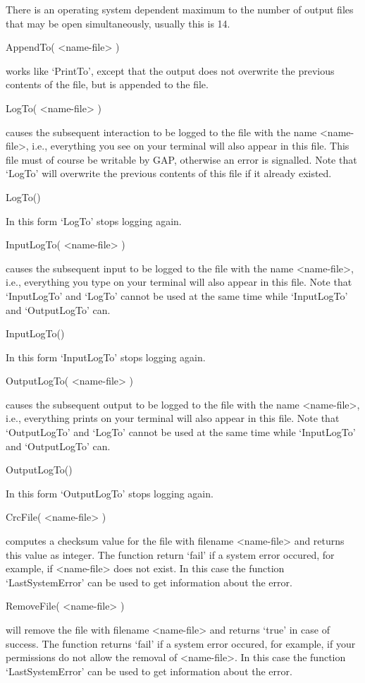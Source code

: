 There is an  operating system dependent maximum  to the number  of output
files that may be open simultaneously, usually this is 14.

\>AppendTo( <name-file> )

works like `PrintTo',  except  that the   output does  not overwrite  the
previous contents of the file, but is appended to the file.

\>LogTo( <name-file> )

causes the subsequent interaction to be logged  to the file with the name
<name-file>, i.e., everything you  see on your  terminal will also appear
in this file.  This file must of course be writable  by GAP, otherwise an
error  is signalled.  Note  that   `LogTo'  will overwrite the   previous
contents of this file if it already existed.

\)LogTo()

In this form `LogTo' stops logging again.

\>InputLogTo( <name-file> )

causes the  subsequent  input to be   logged to the   file with  the name
<name-file>, i.e., everything you type  on your terminal will also appear
in this file.  Note that `InputLogTo'  and `LogTo' cannot  be used at the
same time while `InputLogTo' and `OutputLogTo' can.

\)InputLogTo()

In this form `InputLogTo' stops logging again.

\>OutputLogTo( <name-file> )

causes   the subsequent output to   be logged to  the file  with the name
<name-file>,  i.e., everything {\GAP} prints  on  your terminal will also
appear in this file.  Note that  `OutputLogTo' and `LogTo' cannot be used
at the same time while `InputLogTo' and `OutputLogTo' can.

\)OutputLogTo()

In this form `OutputLogTo' stops logging again.

\>CrcFile( <name-file> )

computes  a checksum  value for the  file  with filename <name-file>  and
returns this value  as integer. The function return   `fail' if a  system
error occured, for example, if <name-file> does not  exist.  In this case
the function `LastSystemError' can  be used to  get information about the
error.

\>RemoveFile( <name-file> )

will remove the file with filename <name-file> and returns `true' in case
of  success.  The function returns `fail' if a  system error occured, for
example, if your permissions do not allow the removal of <name-file>.  In
this case the function  `LastSystemError' can be  used to get information
about the error.

